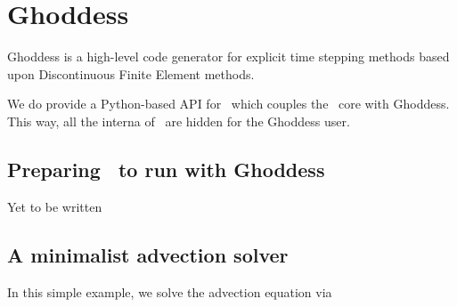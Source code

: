 \chapter{Ghoddess}
\label{section:python-api-examples:ghoddess}


Ghoddess is a high-level code generator for explicit time stepping
methods based upon Discontinuous Finite Element methods.


We do provide a Python-based API for \Peano\ which couples the \Peano\ core with
Ghoddess.
This way, all the interna of \Peano\ are hidden for the Ghoddess user.


\section*{Preparing \Peano\ to run with Ghoddess}

Yet to be written


\section{A minimalist advection solver}

In this simple example, we solve the advection equation via 


